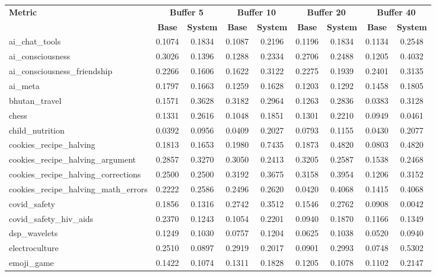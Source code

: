 \begin{landscape}
\begin{longtable}{@{}p{3.8cm}cccccccc@{}}
\toprule
\textbf{Metric} & \multicolumn{2}{c}{\textbf{Buffer 5}} & \multicolumn{2}{c}{\textbf{Buffer 10}} & \multicolumn{2}{c}{\textbf{Buffer 20}} & \multicolumn{2}{c}{\textbf{Buffer 40}} \\
\cmidrule(lr){2-3}\cmidrule(lr){4-5}\cmidrule(lr){6-7}\cmidrule(lr){8-9}
 & \textbf{Base} & \textbf{System} & \textbf{Base} & \textbf{System} & \textbf{Base} & \textbf{System} & \textbf{Base} & \textbf{System} \\
\midrule
\endhead
ai\_chat\_tools & 0.1074 & 0.1834 & 0.1087 & 0.2196 & 0.1196 & 0.1834 & 0.1134 & 0.2548 \\
ai\_consciousness & 0.3026 & 0.1396 & 0.1288 & 0.2334 & 0.2706 & 0.2488 & 0.1205 & 0.4032 \\
ai\_consciousness\_friendship & 0.2266 & 0.1606 & 0.1622 & 0.3122 & 0.2275 & 0.1939 & 0.2401 & 0.3135 \\
ai\_meta & 0.1797 & 0.1663 & 0.1259 & 0.1628 & 0.1203 & 0.1292 & 0.1458 & 0.1805 \\
bhutan\_travel & 0.1571 & 0.3628 & 0.3182 & 0.2964 & 0.1263 & 0.2836 & 0.0383 & 0.3128 \\
chess & 0.1331 & 0.2616 & 0.1048 & 0.1851 & 0.1301 & 0.2210 & 0.0949 & 0.0461 \\
child\_nutrition & 0.0392 & 0.0956 & 0.0409 & 0.2027 & 0.0793 & 0.1155 & 0.0430 & 0.2077 \\
cookies\_recipe\_halving & 0.1813 & 0.1653 & 0.1980 & 0.7435 & 0.1873 & 0.4820 & 0.0803 & 0.4820 \\
cookies\_recipe\_halving\_argument & 0.2857 & 0.3270 & 0.3050 & 0.2413 & 0.3205 & 0.2587 & 0.1538 & 0.2468 \\
cookies\_recipe\_halving\_corrections & 0.2500 & 0.2500 & 0.3192 & 0.3675 & 0.3158 & 0.3954 & 0.1206 & 0.3152 \\
cookies\_recipe\_halving\_math\_errors & 0.2222 & 0.2586 & 0.2496 & 0.2620 & 0.0420 & 0.4068 & 0.1415 & 0.4068 \\
covid\_safety & 0.1856 & 0.1316 & 0.2742 & 0.3512 & 0.1546 & 0.2762 & 0.0908 & 0.0042 \\
covid\_safety\_hiv\_aids & 0.2370 & 0.1243 & 0.1054 & 0.2201 & 0.0940 & 0.1870 & 0.1166 & 0.1349 \\
dsp\_wavelets & 0.1249 & 0.1030 & 0.0757 & 0.1204 & 0.0625 & 0.1038 & 0.0520 & 0.0940 \\
electroculture & 0.2510 & 0.0897 & 0.2919 & 0.2017 & 0.0901 & 0.2993 & 0.0748 & 0.5302 \\
emoji\_game & 0.1422 & 0.1074 & 0.1311 & 0.1828 & 0.1205 & 0.1078 & 0.1102 & 0.2147 \\

\end{longtable}
\end{landscape}
